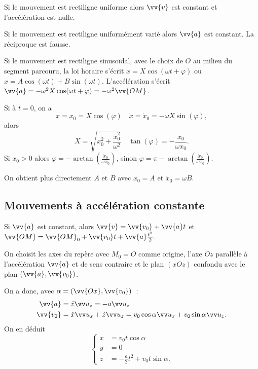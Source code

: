 Si le mouvement est rectiligne uniforme alors \(\vv{v}\) est constant et 
l'accélération est nulle.

Si le mouvement est rectiligne uniformément varié alors \(\vv{a}\) est 
constant. La réciproque est fausse.

Si le mouvement est rectiligne sinusoïdal, avec le choix de \(O\) au milieu du 
segment parcouru, la loi horaire s'écrit \(x=X\cos(\omega t+\varphi)\) ou 
\(x=A\cos(\omega t) + B\sin(\omega t)\). L'accélération s'écrit 
\(\vv{a}=-\omega^2X\cos(\omega t+\varphi)=-\omega^2 \vv{OM}\).

Si à \(t=0\), on a
\begin{equation}%
  x=x_0=X\cos(\varphi) \quad \dot{x}=\dot{x}_0=-\omega X\sin(\varphi),
\end{equation}%
alors
\begin{equation}%
  X=\sqrt{x_0^2+\frac{\dot{x}_0^2}{\omega^2}} \quad 
  \tan(\varphi)=-\frac{\dot{x}_0}{\omega x_0}.
\end{equation}%
Si \(x_0>0\) alors \(\varphi=-\arctan\left(\frac{\dot{x}_0}{\omega 
x_0}\right)\), sinon \(\varphi=\pi-\arctan\left(\frac{\dot{x}_0}{\omega 
x_0}\right)\).

On obtient plus directement \(A\) et \(B\) avec \(x_0=A\) et \(\dot{x}_0=\omega 
B\).

\subsection{Mouvements à accélération constante} %
\label{chap1-subsec:accelerationcst}%

Si \(\vv{a}\) est constant, alors \(\vv{v}=\vv{v_0}+\vv{a}t\) et \(\vv{OM}= 
\vv{OM}_0+ \vv{v_0} t + \vv{a}\frac{t^2}{2}\).%

On choisit les axes du repère avec \(M_0=O\) comme origine, l'axe \(Oz\) 
parallèle à l'accélération \(\vv{a}\) et de sens contraire et le plan \((xOz)\) 
confondu avec le plan \((\vv{a},\vv{v_0})\).

On a donc, avec \(\alpha=(\vv{Ox},\vv{v_0})\)~:
\begin{align}%
  \vv{a}&=\ddot{z} \uz=-a\uz \\%
  \vv{v_0}&=\dot{x}\ux+\dot{z}\uz=v_0\cos\alpha\ux+v_0\sin\alpha\uz.%
\end{align}%
On en déduit
\begin{equation}%
  \begin{cases}%
    x&=v_0 t \cos\alpha\\
    y&=0\\
    z&=-\frac{a}{2}t^2+v_0 t \sin\alpha.
  \end{cases}%
\end{equation}%

